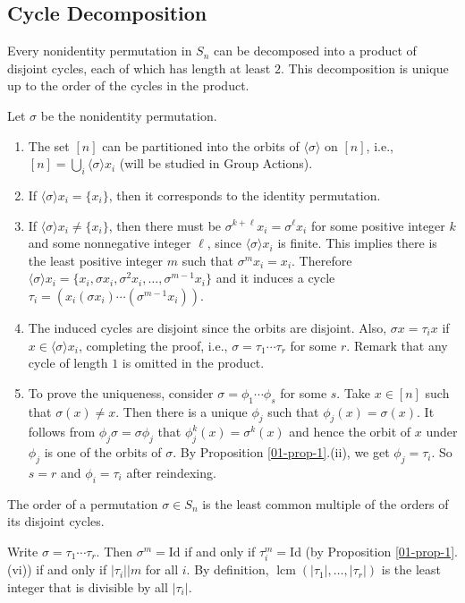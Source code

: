 \subsection{Cycle Decomposition}
\begin{theorem} \label{thm-cycle-decomposition}
	Every nonidentity permutation in $S_n$ can be decomposed into a product of disjoint cycles, each of which has length at least $2$. This decomposition is unique
	up to the order of the cycles in the product.
\end{theorem} 
\begin{sketch} Let $\sigma$ be the nonidentity permutation.
	\begin{enumerate}
		\item The set $[n]$ can be partitioned into the orbits of $\langle \sigma\rangle$ on $[n]$, i.e., $[n] = \bigcup_i \langle \sigma\rangle x_i$ (will be studied in Group Actions).
		\item If $\langle \sigma\rangle x_i = \{x_i\}$, then it corresponds to the identity permutation.
		\item If $\langle \sigma\rangle x_i \neq \{x_i\}$, then there must be $\sigma^{k+\ell} x_i = \sigma^{\ell} x_i$ for some positive integer $k$ and some nonnegative integer $\ell$, since $\langle\sigma\rangle x_i$ is finite. This implies there is the least positive integer  $m$ such that $\sigma^m x_i = x_i$. Therefore $\langle \sigma\rangle x_i = \{x_i,\sigma x_i, \sigma^2 x_i,\dots, \sigma^{m-1}x_i\}$ and it induces a cycle $\tau_i = (x_i(\sigma x_i)\cdots (\sigma^{m-1}x_i))$.
		\item  The induced cycles are disjoint since the orbits are disjoint. Also, $\sigma x = \tau_i x$ if $x\in \langle \sigma\rangle x_i$, completing the proof, i.e., $\sigma = \tau_1\cdots \tau_r$ for some $r$. Remark that any cycle of length $1$ is omitted in the product.
		\item To prove the uniqueness,  consider $\sigma  = \phi_1\cdots \phi_s$ for some $s$. Take $x\in[n]$ such that $\sigma(x)\neq x$. Then there is a unique $\phi_j$ such that $\phi_j(x) = \sigma(x)$. It follows from $\phi_j\sigma  = \sigma\phi_j$ that $\phi^k_j(x) = \sigma^k(x)$ and hence the orbit of $x$ under $\phi_j$ is one of  the orbits of $\sigma$. By Proposition \ref{01-prop-1}.(ii), we get  $\phi_j = \tau_i$. So $s=r$ and $\phi_i =\tau_i$ after reindexing. \qedhere
	\end{enumerate}
\end{sketch}

\begin{corollary}
	The order of a permutation $\sigma\in S_n$ is the least common multiple of the orders of its disjoint cycles.
\end{corollary}
\begin{sketch}Write $\sigma = \tau_1\cdots \tau_r$. Then
	$\sigma^m = \text{Id}$ if and only if $\tau_i^m = \text{Id}$ (by Proposition \ref{01-prop-1}.(vi)) if and only if $|\tau_i|\big|m$ for all $i$. By definition, $\operatorname{lcm}(|\tau_1|,\dots,|\tau_r|)$ is the least integer that is divisible by all $|\tau_i|$.  
\end{sketch}

